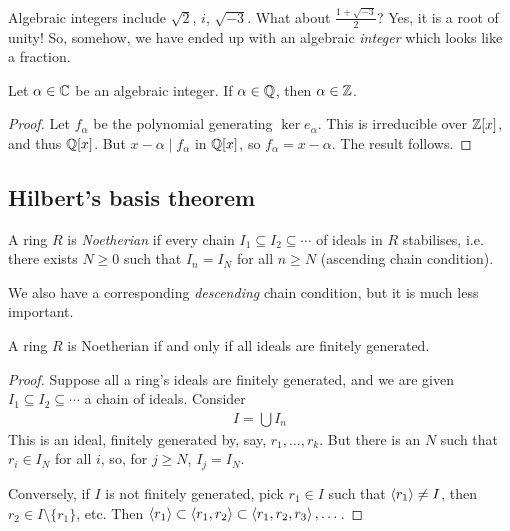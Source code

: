\documentclass{../../template/note}
\begin{document}
    \begin{example*}
        Algebraic integers include $\sqrt 2$, $i$, $\sqrt{-3}$. What about $\frac{1+\sqrt{-3}}{2}$? Yes, it is a root of unity! So, somehow, we have ended up with an algebraic \emph{integer} which looks like a fraction.
    \end{example*}
    
    \begin{proposition}
        Let $\alpha \in \mathbb C$ be an algebraic integer. If $\alpha \in \mathbb Q$, then $\alpha \in \mathbb Z$.
    \end{proposition}
    
    \begin{proof}
        Let $f_\alpha$ be the polynomial generating $\ker e_\alpha$. This is irreducible over $\mathbb Z[x]$, and thus $\mathbb Q[x]$. But $x-\alpha \mid f_\alpha$ in $\mathbb Q[x]$, so $f_\alpha = x-\alpha$. The result follows.
    \end{proof}    
    
    
    \subsection{Hilbert's basis theorem}

    \begin{definition}
        A ring $R$ is \emph{Noetherian} if every chain $I_1 \subseteq I_2 \subseteq \cdots$ of ideals in $R$ stabilises, i.e. there exists $N \geq 0$ such that $I_n = I_N$ for all $n \geq N$ (ascending chain condition).
    \end{definition}
    
    \begin{remark*}
        We also have a corresponding \emph{descending} chain condition, but it is much less important.
    \end{remark*}
    
    \begin{proposition}
        A ring $R$ is Noetherian if and only if all ideals are finitely generated.
    \end{proposition}
    
    \begin{proof}
        Suppose all a ring's ideals are finitely generated, and we are given $I_1 \subseteq I_2 \subseteq \cdots$ a chain of ideals. Consider
        \begin{align*}
            I = \bigcup I_n
        \end{align*}
        This is an ideal, finitely generated by, say, $r_1, \dots, r_k$. But there is an $N$ such that $r_i \in I_N$ for all $i$, so, for $j \geq N$, $I_j = I_N$.

        Conversely, if $I$ is not finitely generated, pick $r_1 \in I$ such that $\left \langle r_1 \right \rangle \neq I$, then $r_2 \in I \setminus \{r_1\}$, etc. Then $\left \langle r_1 \right \rangle \subset \left \langle r_1, r_2 \right \rangle \subset \left \langle r_1, r_2, r_3 \right \rangle, \dots$.
    \end{proof}
    
\end{document}
